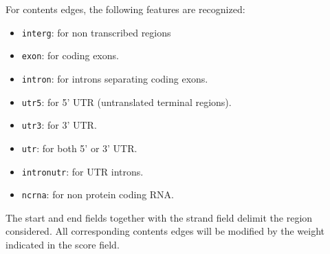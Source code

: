 For contents edges, the following features are recognized:
\begin{itemize}
\item \texttt{interg}: for non transcribed regions
\item \texttt{exon}: for coding exons.
\item \texttt{intron}: for introns separating coding exons.
\item \texttt{utr5}: for 5' UTR (untranslated terminal regions).
\item \texttt{utr3}: for 3' UTR.
\item \texttt{utr}: for both 5' or 3' UTR.
\item \texttt{intronutr}: for UTR introns.
\item \texttt{ncrna}: for non protein coding RNA.
\end{itemize}
The start and end fields together with the strand field delimit the
region considered. All corresponding contents edges will be modified
by the weight indicated in the score field.



